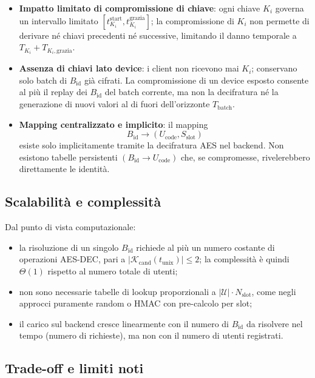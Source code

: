 \documentclass[a4paper,11pt]{article}
\begin{document}
\begin{itemize}
  \item \textbf{Impatto limitato di compromissione di chiave}: ogni chiave \(K_i\) governa un
        intervallo limitato \([t_{K_i}^{\text{start}}, t_{K_i}^{\text{grazia}}]\); la compromissione
        di \(K_i\) non permette di derivare né chiavi precedenti né successive, limitando il danno
        temporale a \(T_{K_i} + T_{K_i,\mathrm{grazia}}\).
  \item \textbf{Assenza di chiavi lato device}: i client non ricevono mai \(K_i\); conservano solo
        batch di \(B_{\text{id}}\) già cifrati. La compromissione di un device esposto consente
        al più il replay dei \(B_{\text{id}}\) del batch corrente, ma non la decifratura né la
        generazione di nuovi valori al di fuori dell’orizzonte \(T_{\text{batch}}\).
  \item \textbf{Mapping centralizzato e implicito}: il mapping
        \[
          B_{\text{id}} \longrightarrow (U_{\text{code}}, S_{\text{slot}})
        \]
        esiste solo implicitamente tramite la decifratura AES nel backend. Non esistono tabelle
        persistenti \((B_{\text{id}} \to U_{\text{code}})\) che, se compromesse, rivelerebbero
        direttamente le identità.
\end{itemize}

\subsection{Scalabilità e complessità}

Dal punto di vista computazionale:

\begin{itemize}
  \item la risoluzione di un singolo \(B_{\text{id}}\) richiede al più un numero costante di
        operazioni AES-DEC, pari a \(|\mathcal{K}_{\mathrm{cand}}(t_{\text{unix}})| \le 2\); la
        complessità è quindi \(\Theta(1)\) rispetto al numero totale di utenti;
  \item non sono necessarie tabelle di lookup proporzionali a
        \( |\mathcal{U}| \cdot N_{\text{slot}} \), come negli approcci puramente random o HMAC
        con pre-calcolo per slot;
  \item il carico sul backend cresce linearmente con il numero di \(B_{\text{id}}\) da risolvere
        nel tempo (numero di richieste), ma non con il numero di utenti registrati.
\end{itemize}

\subsection{Trade-off e limiti noti}
\end{document}
